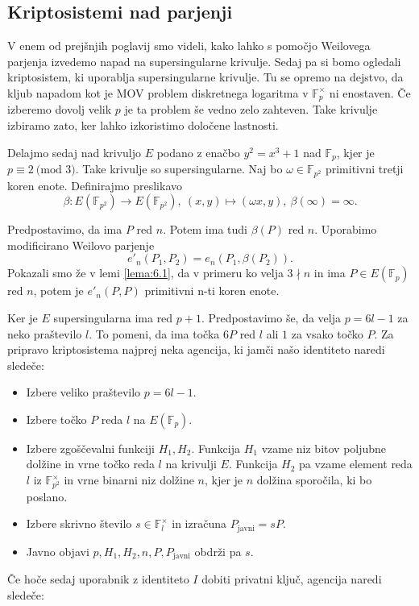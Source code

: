 \documentclass[12pt,a4paper,twoside]{article}
\theoremstyle{definition} %
\theoremstyle{plain} %
\numberwithin{equation}{section}  %
\newcommand{\F}{\mathbb F}
\newcommand{\E}[1]{E({#1})}
\newcommand{\MOD}[1]{\ \text{(mod }{#1}\text{)}}
\begin{document}
\subsection{Kriptosistemi nad parjenji}

V enem od prejšnjih poglavij smo videli, kako lahko s pomočjo Weilovega parjenja izvedemo napad na supersingularne krivulje. Sedaj pa si bomo ogledali kriptosistem, ki uporablja supersingularne krivulje. Tu se opremo na dejstvo, da kljub napadom kot je MOV problem diskretnega logaritma v $\F^{\times}_p$ ni enostaven. Če izberemo dovolj velik $p$ je ta problem še vedno zelo zahteven. Take krivulje izbiramo zato, ker lahko izkoristimo določene lastnosti.

Delajmo sedaj nad krivuljo $E$ podano z enačbo $y^2=x^3+1$ nad $\F_p$, kjer je $p \equiv 2 \MOD{3}$. Take krivulje so supersingularne. Naj bo $\omega \in \F_{p^2}$ primitivni tretji koren enote. Definirajmo preslikavo
$$\beta:\E{\F_{p^2}} \rightarrow \E{\F_{p^2}}, \ (x,y) \mapsto (\omega x,y), \ \beta(\infty) = \infty.$$

Predpostavimo, da ima $P$ red $n$. Potem ima tudi $\beta(P)$ red $n$. Uporabimo modificirano Weilovo parjenje
$$e'_n(P_1,P_2)  =e_n(P_1,\beta(P_2)).$$
Pokazali smo že v lemi \ref{lema:6.1}, da v primeru ko velja $3 \nmid n$ in ima $P \in \E{\F_p}$ red $n$, potem je $e'_n(P,P)$ primitivni n-ti koren enote.

Ker je $E$ supersingularna ima red $p+1$. Predpostavimo še, da velja $p = 6l-1$ za neko praštevilo $l$. To pomeni, da ima točka $6P$ red $l$ ali $1$ za vsako točko $P$.
Za pripravo kriptosistema najprej neka agencija, ki jamči našo identiteto naredi sledeče:
\begin{itemize}
\item Izbere veliko praštevilo $p = 6l-1$.
\item Izbere točko $P$ reda $l$ na $\E{\F_p}$.
\item Izbere zgoščevalni funkciji $H_1, H_2$. Funkcija $H_1$ vzame niz bitov poljubne dolžine in vrne točko reda $l$ na krivulji $E$. Funkcija $H_2$ pa vzame element reda $l$ iz $\F^{\times}_{p^2}$ in vrne binarni niz dolžine $n$, kjer je $n$ dolžina sporočila, ki bo poslano.
\item Izbere skrivno število $s\in \F^{\times}_l$ in izračuna $P_{\text{javni}} = sP$.
\item Javno objavi $p,H_1,H_2,n,P,P_{\text{javni}}$ obdrži pa $s$.
\end{itemize}

Če hoče sedaj uporabnik z identiteto $I$ dobiti privatni ključ, agencija naredi sledeče:
\end{document}
